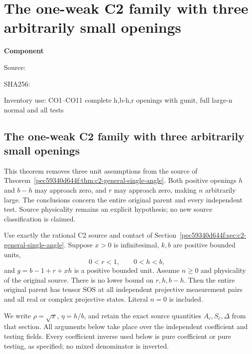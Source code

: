 \chapter{The one-weak C2 family with three arbitrarily small openings}
\label{component:p81893ad08bed}
\noindent\textbf{Component }\par
{\small\noindent Source: \par}
{\small\noindent SHA256: \par}
{\small\noindent Inventory use: CO1--CO11 complete h,b-h,r openings with gunit, full large-n normal and all tests\par}
\medskip
\section{The one-weak C2 family with three arbitrarily small openings}
\label{p81893ad08bed:sec:c2-three-openings}

This theorem removes three unit assumptions from the source of
Theorem~\ref{pec59340d644f:thm:c2-general-single-angle}.  Both positive openings $h$
and $b-h$ may approach zero, and $r$ may approach zero, making $n$
arbitrarily large.  The conclusions concern the entire original parent
and every independent test.  Source physicality remains an explicit
hypothesis; no new source classification is claimed.

\begin{theorem}
\label{p81893ad08bed:thm:c2-three-openings}
Use exactly the rational C2 source and contact of
Section~\ref{pec59340d644f:sec:c2-general-single-angle}.  Suppose $x>0$ is
infinitesimal, $k,b$ are positive bounded units,
\[
             0<r<1,\qquad 0<h<b,
\]
and $g=b-1+r+xh$ is a positive bounded unit.  Assume $n\geq0$
and physicality of the original source.  There is no lower bound on
$r,h,b-h$.  Then the entire original parent has tensor SOS at all
independent projective measurement pairs and all real or complex
projective states.  Literal $n=0$ is included.
\end{theorem}

We write $\rho=\sqrt x$, $\eta=h/b$, and retain the exact source
quantities $A_c,S_c,\Delta$ from that section.  All arguments below
take place over the independent coefficient and testing fields.
Every coefficient inverse used below is pure coefficient or pure
testing, as specified; no mixed denominator is inverted.

